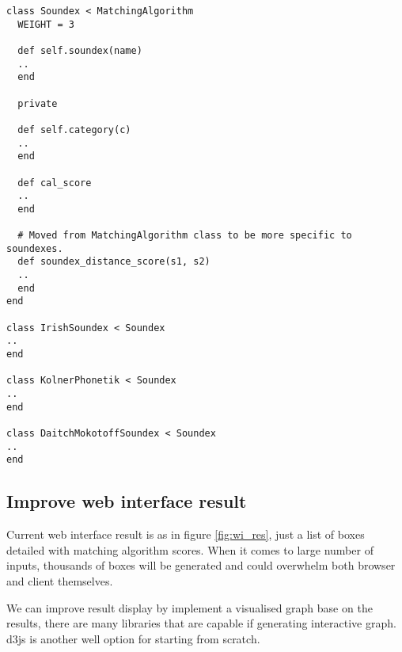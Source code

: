 \begin{minipage}{\linewidth}
  \begin{lstlisting}[label={lst:sd_in}, caption={\texttt{Soundex} inheritance.}]
class Soundex < MatchingAlgorithm
  WEIGHT = 3

  def self.soundex(name)
  ..
  end

  private

  def self.category(c)
  ..
  end

  def cal_score
  ..
  end

  # Moved from MatchingAlgorithm class to be more specific to soundexes.
  def soundex_distance_score(s1, s2)
  ..
  end
end

class IrishSoundex < Soundex
..
end

class KolnerPhonetik < Soundex
..
end

class DaitchMokotoffSoundex < Soundex
..
end
\end{lstlisting}
\end{minipage}

\subsection{Improve web interface result}

Current web interface result is as in figure \ref{fig:wi_res}, just
a list of boxes detailed with matching algorithm scores. When it
comes to large number of inputs, thousands of boxes will be generated
and could overwhelm both browser and client themselves.

We can improve result display by implement a visualised graph base on
the results, there are many libraries \cite[]{chart} that are capable
if generating interactive graph. d3js is another well option for
starting from scratch.
